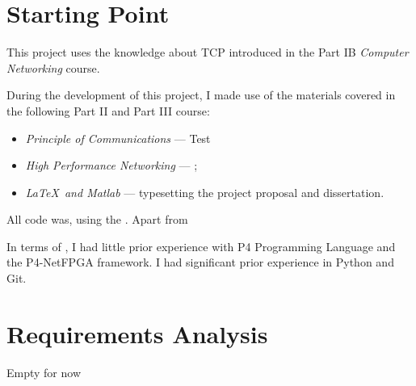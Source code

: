 \section{Starting Point}
This project uses the knowledge about TCP introduced in the Part IB \textit{Computer Networking} course. 

During the development of this project, I made use of the materials covered in the following Part II and Part III course:
\begin{itemize}
	\item \textit{Principle of Communications} --- Test
	\item \textit{High Performance Networking} --- ;
	\item \textit{\LaTeX \ and Matlab} --- typesetting the project proposal and dissertation.
\end{itemize}

All code was, using the . Apart from 

In terms of , I had little prior experience with P4 Programming Language and the P4-NetFPGA framework.  I had significant prior experience in Python and Git.

\section{Requirements Analysis}
	Empty for now
